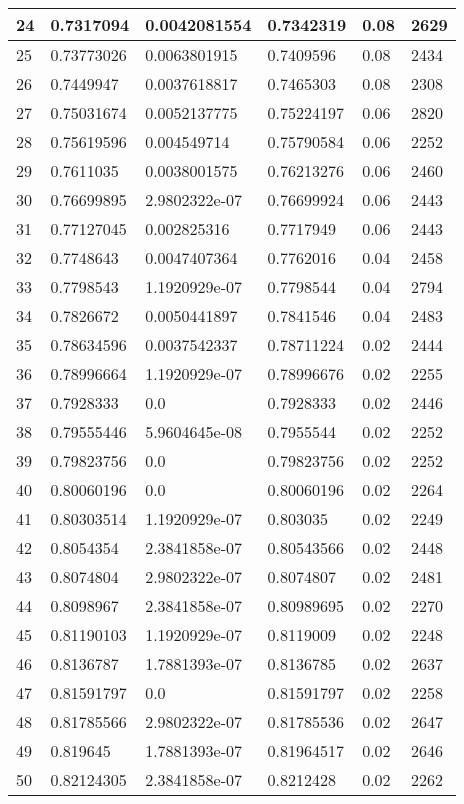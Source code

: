 \begin{longtable}{|l|l|l|l|l|l|}
24 & 0.7317094 & 0.0042081554 & 0.7342319 & 0.08 & 2629 \\ \hline 
25 & 0.73773026 & 0.0063801915 & 0.7409596 & 0.08 & 2434 \\ \hline 
26 & 0.7449947 & 0.0037618817 & 0.7465303 & 0.08 & 2308 \\ \hline 
27 & 0.75031674 & 0.0052137775 & 0.75224197 & 0.06 & 2820 \\ \hline 
28 & 0.75619596 & 0.004549714 & 0.75790584 & 0.06 & 2252 \\ \hline 
29 & 0.7611035 & 0.0038001575 & 0.76213276 & 0.06 & 2460 \\ \hline 
30 & 0.76699895 & 2.9802322e-07 & 0.76699924 & 0.06 & 2443 \\ \hline 
31 & 0.77127045 & 0.002825316 & 0.7717949 & 0.06 & 2443 \\ \hline 
32 & 0.7748643 & 0.0047407364 & 0.7762016 & 0.04 & 2458 \\ \hline 
33 & 0.7798543 & 1.1920929e-07 & 0.7798544 & 0.04 & 2794 \\ \hline 
34 & 0.7826672 & 0.0050441897 & 0.7841546 & 0.04 & 2483 \\ \hline 
35 & 0.78634596 & 0.0037542337 & 0.78711224 & 0.02 & 2444 \\ \hline 
36 & 0.78996664 & 1.1920929e-07 & 0.78996676 & 0.02 & 2255 \\ \hline 
37 & 0.7928333 & 0.0 & 0.7928333 & 0.02 & 2446 \\ \hline 
38 & 0.79555446 & 5.9604645e-08 & 0.7955544 & 0.02 & 2252 \\ \hline 
39 & 0.79823756 & 0.0 & 0.79823756 & 0.02 & 2252 \\ \hline 
40 & 0.80060196 & 0.0 & 0.80060196 & 0.02 & 2264 \\ \hline 
41 & 0.80303514 & 1.1920929e-07 & 0.803035 & 0.02 & 2249 \\ \hline 
42 & 0.8054354 & 2.3841858e-07 & 0.80543566 & 0.02 & 2448 \\ \hline 
43 & 0.8074804 & 2.9802322e-07 & 0.8074807 & 0.02 & 2481 \\ \hline 
44 & 0.8098967 & 2.3841858e-07 & 0.80989695 & 0.02 & 2270 \\ \hline 
45 & 0.81190103 & 1.1920929e-07 & 0.8119009 & 0.02 & 2248 \\ \hline 
46 & 0.8136787 & 1.7881393e-07 & 0.8136785 & 0.02 & 2637 \\ \hline 
47 & 0.81591797 & 0.0 & 0.81591797 & 0.02 & 2258 \\ \hline 
48 & 0.81785566 & 2.9802322e-07 & 0.81785536 & 0.02 & 2647 \\ \hline 
49 & 0.819645 & 1.7881393e-07 & 0.81964517 & 0.02 & 2646 \\ \hline 
50 & 0.82124305 & 2.3841858e-07 & 0.8212428 & 0.02 & 2262 \\ \hline 
\end{longtable}